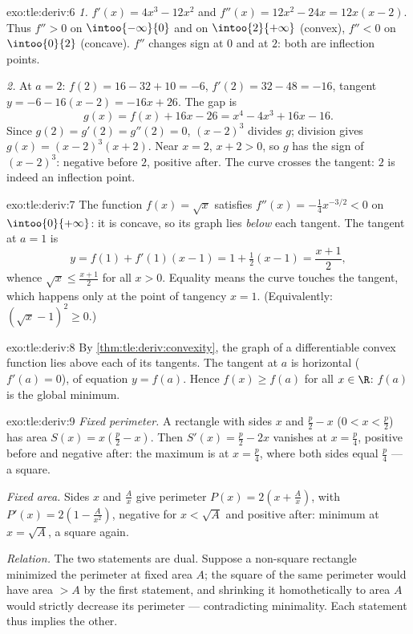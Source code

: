 \begin{solution}{exo:tle:deriv:6}
\emph{1.} $f'(x) = 4x^3 - 12x^2$ and $f''(x) = 12x^2 - 24x = 12x(x-2)$.
Thus $f'' > 0$ on $\intoo{-\infty}{0}$ and on $\intoo{2}{+\infty}$ (convex),
$f'' < 0$ on $\intoo{0}{2}$ (concave). $f''$ changes sign at $0$ and at $2$:
both are inflection points.

\emph{2.} At $a = 2$: $f(2) = 16 - 32 + 10 = -6$, $f'(2) = 32 - 48 = -16$,
tangent $y = -6 - 16(x-2) = -16x + 26$. The gap is
\[
g(x) = f(x) + 16x - 26 = x^4 - 4x^3 + 16x - 16 .
\]
Since $g(2) = g'(2) = g''(2) = 0$, $(x-2)^3$ divides $g$; division gives
$g(x) = (x-2)^3(x+2)$. Near $x = 2$, $x + 2 > 0$, so $g$ has the sign of
$(x-2)^3$: negative before $2$, positive after. The curve crosses the
tangent: $2$ is indeed an inflection point.
\end{solution}

\begin{solution}{exo:tle:deriv:7}
The function $f(x) = \sqrt{x}$ satisfies
$f''(x) = -\frac{1}{4}x^{-3/2} < 0$ on $\intoo{0}{+\infty}$: it is concave,
so its graph lies \emph{below} each tangent. The tangent at $a = 1$ is
\[
y = f(1) + f'(1)(x - 1) = 1 + \tfrac12 (x-1) = \frac{x+1}{2},
\]
whence $\sqrt{x} \leq \frac{x+1}{2}$ for all $x > 0$. Equality means the
curve touches the tangent, which happens only at the point of tangency
$x = 1$. (Equivalently: $\left(\sqrt x - 1\right)^2 \geq 0$.)
\end{solution}

\begin{solution}{exo:tle:deriv:8}
By \cref{thm:tle:deriv:convexity}, the graph of a differentiable convex
function lies above each of its tangents. The tangent at $a$ is horizontal
($f'(a) = 0$), of equation $y = f(a)$. Hence $f(x) \geq f(a)$ for all
$x \in \R$: $f(a)$ is the global minimum.
\end{solution}

\begin{solution}{exo:tle:deriv:9}
\emph{Fixed perimeter.} A rectangle with sides $x$ and $\frac{p}{2} - x$
($0 < x < \frac p2$) has area $S(x) = x\left(\frac p2 - x\right)$. Then
$S'(x) = \frac p2 - 2x$ vanishes at $x = \frac p4$, positive before and
negative after: the maximum is at $x = \frac{p}{4}$, where both sides equal
$\frac p4$ --- a square.

\emph{Fixed area.} Sides $x$ and $\frac Ax$ give perimeter
$P(x) = 2\left(x + \frac Ax\right)$, with
$P'(x) = 2\left(1 - \frac{A}{x^2}\right)$, negative for $x < \sqrt A$ and
positive after: minimum at $x = \sqrt{A}$, a square again.

\emph{Relation.} The two statements are dual. Suppose a non-square rectangle
minimized the perimeter at fixed area $A$; the square of the same perimeter
would have area $> A$ by the first statement, and shrinking it homothetically
to area $A$ would strictly decrease its perimeter --- contradicting
minimality. Each statement thus implies the other.
\end{solution}
